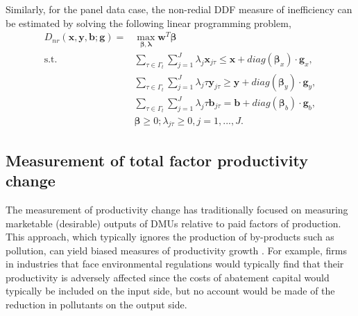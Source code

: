 Similarly, for the panel data case, the non-redial DDF measure of inefficiency can be estimated by solving the following linear programming problem,
\begin{equation}\begin{split}\label{eq_eff_nr_panel}
    D_{nr} (\pmb{x},\pmb{y},\pmb{b};\pmb{g}) 
    = &\max _{\pmb{\beta},\pmb{\lambda}} \pmb{w}^T \pmb{\beta}  \\ 
    \text{s.t.} &\sum\limits_{\tau \in \Gamma_t }\sum\limits_{j = 1}^J {{\lambda _j}{{\pmb{x}}_{j\tau}} \le \pmb{x} + diag(\pmb{\beta}_x)\cdot \pmb{g}_x}, \\ 
                &\sum\limits_{\tau \in \Gamma_t }\sum\limits_{j = 1}^J {{\lambda _j\tau}{{\pmb{y}}_{j\tau}} \ge \pmb{y} + diag(\pmb{\beta}_y)\cdot \pmb{g}_y}, \\ 
                &\sum\limits_{\tau \in \Gamma_t }\sum\limits_{j = 1}^J {{\lambda _j\tau}{{\pmb{b}}_{j\tau}} = \pmb{b} + diag(\pmb{\beta}_b)\cdot \pmb{g}_b}, \\ 
                &\pmb{\beta} \ge 0; \lambda_{j\tau} \ge 0, j = 1,...,J.
\end{split}\end{equation}


\subsection{Measurement of total factor productivity change}
The measurement of productivity change has traditionally focused on measuring marketable (desirable) outputs of DMUs relative to paid factors of production. 
This approach, which typically ignores the production of by-products such as pollution, can yield biased measures of productivity growth \citep{Chung1997}. 
For example, firms in industries that face environmental regulations would typically find that their productivity is adversely affected since the costs of abatement capital would typically be included on the input side, but no account would be made of the reduction in pollutants on the output side.

